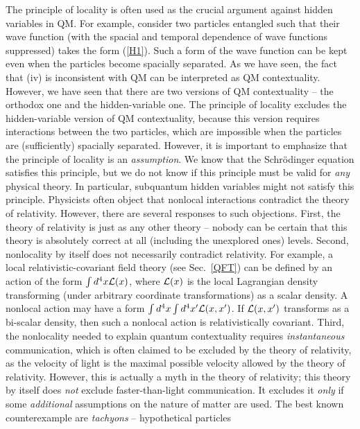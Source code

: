 \documentclass[12pt]{article}
\begin{document}
The principle of locality is often used as the crucial argument against 
hidden variables in QM. For example, consider two particles entangled 
such that their wave function 
(with the spacial and temporal dependence of wave functions suppressed)
takes the form 
(\ref{H1}). Such a form of the wave function can be kept even 
when the particles become spacially separated. As we have seen, 
the fact that (iv) is inconsistent with QM can be interpreted 
as QM contextuality. However, we have seen that
there are two versions of QM contextuality --
the orthodox one and the hidden-variable one.
The principle of locality excludes the hidden-variable version 
of QM contextuality, because this version 
requires interactions between the two particles, which are 
impossible when the particles are (sufficiently) spacially separated.
However, it is important to emphasize that the principle of 
locality is an {\em assumption}. We know that the Schr\"odinger equation 
satisfies this principle, but we do not know if this principle 
must be valid for {\em any} physical theory. In particular, 
subquantum hidden variables might not satisfy this principle.
Physicists often object that nonlocal interactions contradict
the theory of relativity. However, there are several responses
to such objections. First, the theory of relativity is just as 
any other theory -- nobody can be certain that this theory is absolutely 
correct at all (including the unexplored ones) levels. 
Second, nonlocality by itself does not necessarily 
contradict relativity. For example, a local 
relativistic-covariant field theory (see Sec.~\ref{QFT})
can be defined by an action 
of the form $\int d^4x {\cal L}(x)$, where ${\cal L}(x)$ is the local 
Lagrangian density transforming (under arbitrary
coordinate transformations) as a scalar density. A nonlocal 
action may have a form $\int d^4x \int d^4x'{\cal L}(x,x')$. If 
${\cal L}(x,x')$ transforms as a bi-scalar density, then such a nonlocal 
action is relativistically covariant. Third, the nonlocality needed 
to explain quantum contextuality requires {\em instantaneous} 
communication, which is often claimed to be excluded by the theory 
of relativity, as the velocity of light is the maximal possible 
velocity allowed by the theory of relativity. However, this is 
actually a myth in the theory of relativity; this theory by itself 
does {\em not} exclude faster-than-light communication. 
It excludes it {\em only} if some {\em additional} assumptions 
on the nature of matter are used. The best known counterexample 
are {\em tachyons} \cite{tachyon} -- hypothetical particles
\end{document}
